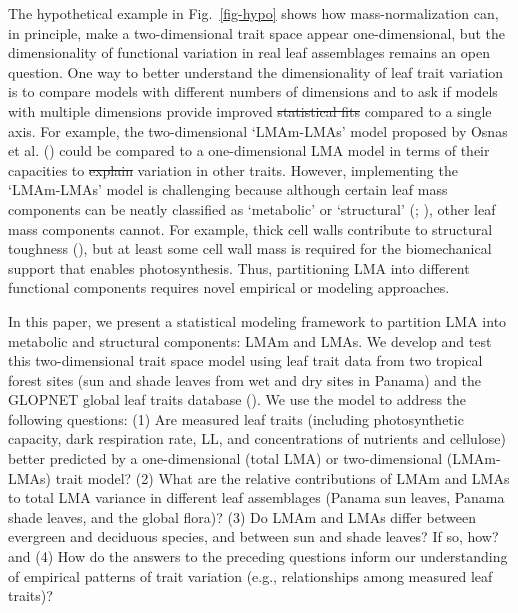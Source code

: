 \documentclass[
  12pt,
  letterpaper,
  DIV=11,
  numbers=noendperiod]{scrartcl}
\providecommand{\DIFadd}[1]{{\protect\color{blue}\uwave{#1}}} %
\providecommand{\DIFdel}[1]{{\protect\color{red}\sout{#1}}}                      %
\providecommand{\DIFaddbegin}{} %
\providecommand{\DIFaddend}{} %
\providecommand{\DIFdelbegin}{} %
\providecommand{\DIFdelend}{} %
\newcommand{\DIFscaledelfig}{0.5}
\newlength{\DIFdelgraphicswidth} %
\newlength{\DIFdelgraphicsheight} %
\newcommand{\DIFaddincludegraphics}[2][]{{\color{blue}\fbox{\DIFOincludegraphics[#1]{#2}}}} %
\newcommand{\DIFdelincludegraphics}[2][]{%
\sbox{\DIFdelgraphicsbox}{\DIFOincludegraphics[#1]{#2}}%
\settoboxwidth{\DIFdelgraphicswidth}{\DIFdelgraphicsbox} %
\settoboxtotalheight{\DIFdelgraphicsheight}{\DIFdelgraphicsbox} %
\scalebox{\DIFscaledelfig}{%
\parbox[b]{\DIFdelgraphicswidth}{\usebox{\DIFdelgraphicsbox}\\[-\baselineskip] \rule{\DIFdelgraphicswidth}{0em}}\llap{\resizebox{\DIFdelgraphicswidth}{\DIFdelgraphicsheight}{%
\setlength{\unitlength}{\DIFdelgraphicswidth}%
\begin{picture}(1,1)%
\thicklines\linethickness{2pt} %
{\color[rgb]{1,0,0}\put(0,0){\framebox(1,1){}}}%
{\color[rgb]{1,0,0}\put(0,0){\line( 1,1){1}}}%
{\color[rgb]{1,0,0}\put(0,1){\line(1,-1){1}}}%
\end{picture}%
}\hspace*{3pt}}} %
} %
\DeclareRobustCommand{\DIFaddbegin}{\DIFOaddbegin \let\includegraphics\DIFaddincludegraphics} %
\DeclareRobustCommand{\DIFaddend}{\DIFOaddend \let\includegraphics\DIFOincludegraphics} %
\DeclareRobustCommand{\DIFdelbegin}{\DIFOdelbegin \let\includegraphics\DIFdelincludegraphics} %
\DeclareRobustCommand{\DIFdelend}{\DIFOaddend \let\includegraphics\DIFOincludegraphics} %
\begin{document}
The hypothetical example in Fig.~\ref{fig-hypo} shows how
mass-normalization can, in principle, make a two-dimensional trait space
appear one-dimensional, but the dimensionality of functional variation
in real leaf assemblages remains an open question. One way to better
understand the dimensionality of leaf trait variation is to compare
models with different numbers of dimensions and to ask if models with
multiple dimensions provide improved \DIFdelbegin \DIFdel{statistical fits }\DIFdelend \DIFaddbegin \DIFadd{predictions and insights }\DIFaddend compared
to a single axis. For example, the two-dimensional `LMAm-LMAs' model
proposed by Osnas et al. () could be
compared to a one-dimensional LMA model in terms of their capacities to
\DIFdelbegin \DIFdel{explain
}\DIFdelend \DIFaddbegin \DIFadd{predict and understand }\DIFaddend variation in other traits. However, implementing
the `LMAm-LMAs' model is challenging because although certain leaf mass
components can be neatly classified as `metabolic' or `structural'
(;
), other leaf mass components
cannot. For example, thick cell walls contribute to structural toughness
(), but at least some cell
wall mass is required for the biomechanical support that enables
photosynthesis. Thus, partitioning LMA into different functional
components requires novel empirical or modeling approaches.

In this paper, we present a statistical modeling framework to partition
LMA into metabolic and structural components: LMAm and LMAs. We develop
and test this two-dimensional trait space model using leaf trait data
from two tropical forest sites (sun and shade leaves from wet and dry
sites in Panama) and the GLOPNET global leaf traits database
(). We use the model to
address the following questions: (1) Are measured leaf traits (including
photosynthetic capacity, dark respiration rate, LL, and concentrations
of nutrients and cellulose) better predicted by a one-dimensional (total
LMA) or two-dimensional (LMAm-LMAs) trait model? (2) What are the
relative contributions of LMAm and LMAs to total LMA variance in
different leaf assemblages (Panama sun leaves, Panama shade leaves, and
the global flora)? (3) Do LMAm and LMAs differ between evergreen and
deciduous species, and between sun and shade leaves? If so, how? and (4)
How do the answers to the preceding questions inform our understanding
of empirical patterns of trait variation (e.g., relationships among
measured leaf traits)?
\end{document}
